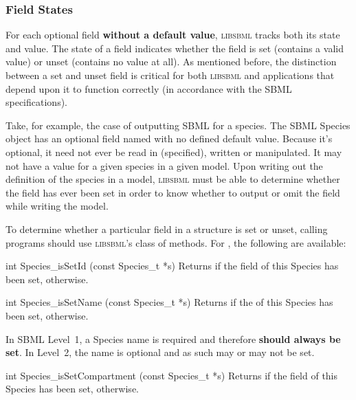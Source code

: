 \documentclass{sbmlmanual}
\newcommand{\libsbml}{\textsc{libsbml}}
\begin{document}
\subsubsection{Field States}
\label{sec:field-states}

For each optional field \textbf{without a default value}, \libsbml{} tracks
both its state and value.  The state of a field indicates whether the field
is set (contains a valid value) or unset (contains no value at all).  As
mentioned before, the distinction between a set and unset field is critical
for both \libsbml{} and applications that depend upon it to function
correctly (in accordance with the SBML specifications).

Take, for example, the case of outputting SBML for a species.  The SBML
Species object has an optional field named  with no defined
default value.  Because it's optional, it need not ever be read in
(specified), written or manipulated.  It may not have a value for a given
species in a given model.  Upon writing out the definition of the species
in a model, \libsbml{} must be able to determine whether the field has ever
been set in order to know whether to output or omit the field while writing
the model.

To determine whether a particular field in a structure is set or unset,
calling programs should use \libsbml{}'s  class of
methods.  For , the following are available:


\begin{methoddef}{int Species\_isSetId (const Species\_t *s)}
  Returns  if the  field of this Species has been set,
   otherwise.
\end{methoddef}


\begin{methoddef}{int Species\_isSetName (const Species\_t *s)}
  Returns  if the  of this Species has been set,
   otherwise.
 
  In SBML Level~1, a Species name is required and therefore \textbf{should
    always be set}.  In Level~2, the name is optional and as such may or
  may not be set.
\end{methoddef}


\begin{methoddef}{int Species\_isSetCompartment (const Species\_t *s)}
  Returns  if the  field of this Species has
  been set,  otherwise.
\end{methoddef}
\end{document}
